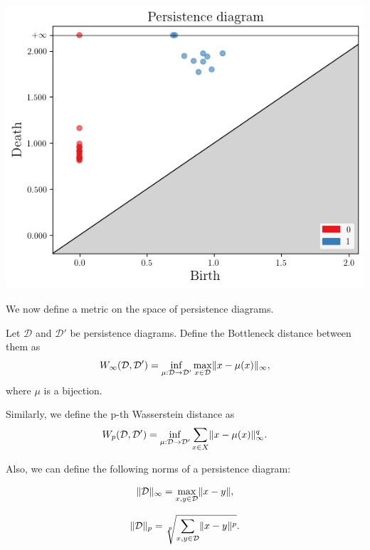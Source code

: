 \begin{center}
\includegraphics[scale=0.8]{figures/torus_persistence_diagram.png}
\end{center}

We now define a metric on the space of persistence diagrams.

\begin{definition}
    Let $\mathcal{D}$ and $\mathcal{D}'$ be persistence diagrams. Define the Bottleneck distance between them as 
    $$
    W_{\infty}(\mathcal{D}, \mathcal{D}') = \inf_{\mu: \mathcal{D} \rightarrow \mathcal{D}'} \max_{x \in \mathcal{D}} \lVert x - \mu(x)\rVert_{\infty},
    $$ 
    where $\mu$ is a bijection. 
\end{definition}

\begin{definition}
    Similarly, we define the p-th Wasserstein distance as 
    $$
    W_{p}(\mathcal{D}, \mathcal{D}') = \inf_{\mu: \mathcal{D} \rightarrow \mathcal{D}'} \sum_{x \in X} \lVert x - \mu(x)\rVert_{\infty}^q.
    $$ 
\end{definition}

Also, we can define the following norms of a persistence diagram:

\begin{definition}
    $$
    \lVert\mathcal{D}\rVert_{\infty} = \max_{x, y \in \mathcal{D}} \lVert x - y\rVert,
    $$
\end{definition}

\begin{definition}
    $$
    \lVert\mathcal{D}\rVert_p = \sqrt[p]{\sum_{x, y \in \mathcal{D}} \lVert x - y\rVert^p}.
    $$
\end{definition}

